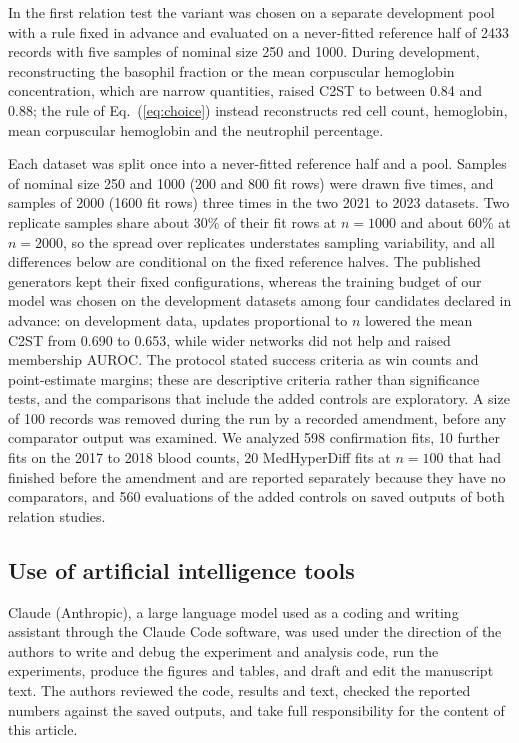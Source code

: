 \documentclass[pdflatex,referee]{sn-jnl}%
\begin{document}
In the first relation test the variant was chosen on a separate development pool with a rule fixed in advance and evaluated on a never-fitted reference half of 2433 records with five samples of nominal size 250 and 1000. During development, reconstructing the basophil fraction or the mean corpuscular hemoglobin concentration, which are narrow quantities, raised C2ST to between 0.84 and 0.88; the rule of Eq.~(\ref{eq:choice}) instead reconstructs red cell count, hemoglobin, mean corpuscular hemoglobin and the neutrophil percentage.

Each dataset was split once into a never-fitted reference half and a pool. Samples of nominal size 250 and 1000 (200 and 800 fit rows) were drawn five times, and samples of 2000 (1600 fit rows) three times in the two 2021 to 2023 datasets. Two replicate samples share about 30\% of their fit rows at $n = 1000$ and about 60\% at $n = 2000$, so the spread over replicates understates sampling variability, and all differences below are conditional on the fixed reference halves. The published generators kept their fixed configurations, whereas the training budget of our model was chosen on the development datasets among four candidates declared in advance: on development data, updates proportional to $n$ lowered the mean C2ST from 0.690 to 0.653, while wider networks did not help and raised membership AUROC. The protocol stated success criteria as win counts and point-estimate margins; these are descriptive criteria rather than significance tests, and the comparisons that include the added controls are exploratory. A size of 100 records was removed during the run by a recorded amendment, before any comparator output was examined. We analyzed 598 confirmation fits, 10 further fits on the 2017 to 2018 blood counts, 20 MedHyperDiff fits at $n = 100$ that had finished before the amendment and are reported separately because they have no comparators, and 560 evaluations of the added controls on saved outputs of both relation studies.

\subsection*{Use of artificial intelligence tools}

Claude (Anthropic), a large language model used as a coding and writing assistant through the Claude Code software, was used under the direction of the authors to write and debug the experiment and analysis code, run the experiments, produce the figures and tables, and draft and edit the manuscript text. The authors reviewed the code, results and text, checked the reported numbers against the saved outputs, and take full responsibility for the content of this article.
\end{document}
